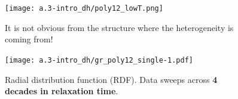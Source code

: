\begin{frame}[c]
\begin{columns}
\begin{column}{0.5\textwidth}
\end{column}

\begin{column}{0.5\textwidth}
\centering  {}


\begin{figure}[t]
\begin{overprint}
\centering\texttt{[image: a.3-intro\_dh/poly12\_lowT.png]}\caption{It is not obvious from the structure where the heterogeneity is coming from!}
\centering\texttt{[image: a.3-intro\_dh/gr\_poly12\_single-1.pdf]}
\caption{Radial distribution function (RDF). Data sweeps across \textbf{4 decades in relaxation time}.}

\end{overprint}

\end{figure}



\end{column}
\end{columns}
\end{frame} 